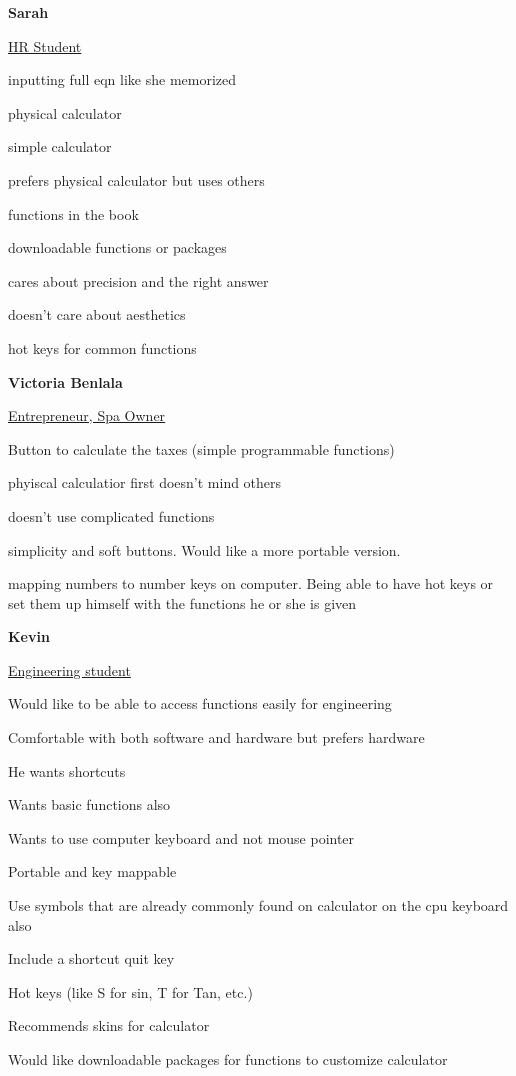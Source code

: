 \documentclass[a4paper, 12pt]{article}
\begin{document}
\textbf{Sarah}

\underline{HR Student}

\begin{compactitem}
\item inputting full eqn like she memorized
\item physical calculator 
\item simple calculator
\item prefers physical calculator but uses others
\item functions in the book
\item downloadable functions or packages
\item cares about precision and the right answer
\item doesn’t care about aesthetics
\item hot keys for common functions
\end{compactitem}
\bigskip

\textbf{Victoria  Benlala}

\underline{Entrepreneur, Spa Owner}

\begin{compactitem}
\item Button to calculate the taxes (simple programmable functions)
\item phyiscal calculatior first doesn’t mind others
\item doesn’t use complicated functions
\item simplicity and soft buttons. Would like a more portable version.
\item mapping numbers to number keys on computer. Being able to have hot keys or set them up himself with the functions he or she is given
\end{compactitem}
\bigskip

\textbf{Kevin}

\underline{Engineering student}

\begin{compactitem}
\item Would like to be able to access functions easily for engineering 
\item Comfortable with both software and hardware but prefers hardware
\item He wants shortcuts
\item Wants basic functions also
\item Wants to use computer keyboard and not mouse pointer
\item Portable and key mappable
\item Use symbols that are already commonly found on calculator on the cpu keyboard also 
\item Include a shortcut quit key
\item Hot keys (like S for sin, T for Tan, etc.)
\item Recommends skins for calculator
\item Would like downloadable packages for functions to customize calculator
\end{compactitem}
\bigskip
\end{document}
